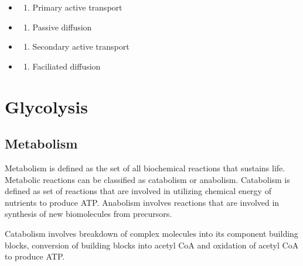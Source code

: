 \documentclass[
]{book}
\providecommand{\tightlist}{%
  \setlength{\itemsep}{0pt}\setlength{\parskip}{0pt}}
\begin{document}
\begin{itemize}
\tightlist
\item
  \begin{enumerate}
  \def\labelenumi{(\Alph{enumi})}
  \tightlist
  \item
    Primary active transport\\
  \end{enumerate}
\item
  \begin{enumerate}
  \def\labelenumi{(\Alph{enumi})}
  \setcounter{enumi}{1}
  \tightlist
  \item
    Passive diffusion\\
  \end{enumerate}
\item
  \begin{enumerate}
  \def\labelenumi{(\Alph{enumi})}
  \setcounter{enumi}{2}
  \tightlist
  \item
    Secondary active transport\\
  \end{enumerate}
\item
  \begin{enumerate}
  \def\labelenumi{(\Alph{enumi})}
  \setcounter{enumi}{3}
  \tightlist
  \item
    Faciliated diffusion
  \end{enumerate}
\end{itemize}

\chapter{Glycolysis}\label{glycolysis}

\section{Metabolism}\label{metabolism}

Metabolism is defined as the set of all biochemical reactions that sustains life. Metabolic reactions can be classified as catabolism or anabolism. Catabolism is defined as set of reactions that are involved in utilizing chemical energy of nutrients to produce ATP. Anabolism involves reactions that are involved in synthesis of new biomolecules from precursors.

Catabolism involves breakdown of complex molecules into its component building blocks, conversion of building blocks into acetyl CoA and oxidation of acetyl CoA to produce ATP.
\end{document}
